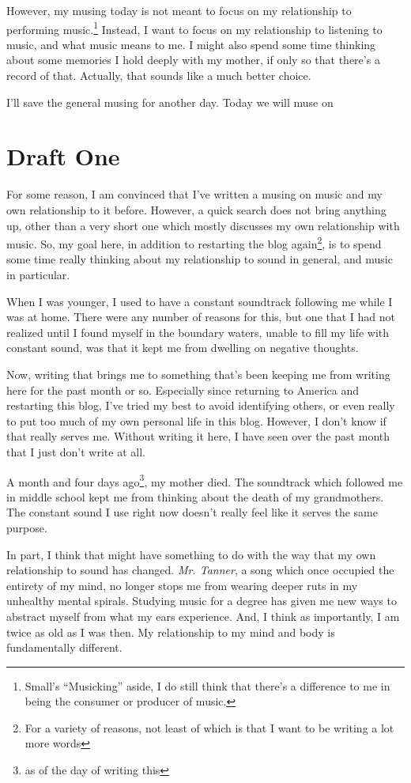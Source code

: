 \documentclass[12pt]{article}[titlepage]
\newcommand{\say}[1]{``#1''}
\newcommand{\1}{\={a}}
\newcommand{\2}{\={e}}
\newcommand{\3}{\={\i}}
\newcommand{\4}{\=o}
\newcommand{\5}{\=u}
\newcommand{\6}{\={A}}
\renewcommand{\,}{\textsuperscript{,}}
\begin{document}
However, my musing today is not meant to focus on my relationship to performing music.\footnote{Small's \say{Musicking} aside, I do still think that there's a difference to me in being the consumer or producer of music.}  
Instead, I want to focus on my relationship to listening to music, and what music means to me.  
I might also spend some time thinking about some memories I hold deeply with my mother, if only so that there's a record of that.  
Actually, that sounds like a much better choice.

I'll save the general musing for another day. Today we will muse on   


\section{Draft One}

For some reason, I am convinced that I've written a musing on music and my own relationship to it before.  
However, a quick search does not bring anything up, other than a very short one which mostly discusses my own relationship with music.  
So, my goal here, in addition to restarting the blog again\footnote{For a variety of reasons, not least of which is that I want to be writing a lot more words}, is to spend some time really thinking about my relationship to sound in general, and music in particular.

When I was younger, I used to have a constant soundtrack following me while I was at home.  
There were any number of reasons for this, but one that I had not realized until I found myself in the boundary waters, unable to fill my life with constant sound, was that it kept me from dwelling on negative thoughts.

Now, writing that brings me to something that's been keeping me from writing here for the past month or so.  
Especially since returning to America and restarting this blog, I've tried my best to avoid identifying others, or even really to put too much of my own personal life in this blog.  
However, I don't know if that really serves me.  
Without writing it here, I have seen over the past month that I just don't write at all.

A month and four days ago\footnote{as of the day of writing this}, my mother died.  
The soundtrack which followed me in middle school kept me from thinking about the death of my grandmothers.  
The constant sound I use right now doesn't really feel like it serves the same purpose.

In part, I think that might have something to do with the way that my own relationship to sound has changed.  
\textit{Mr. Tanner}, a song which once occupied the entirety of my mind, no longer stops me from wearing deeper ruts in my unhealthy mental spirals.  
Studying music for a degree has given me new ways to abstract myself from what my ears experience.  
And, I think as importantly, I am twice as old as I was then.  
My relationship to my mind and body is fundamentally different.
\end{document}
